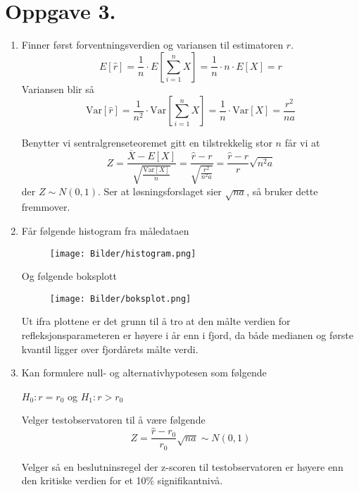\documentclass[a4paper,11pt,norsk]{article}
\begin{document}
\section*{Oppgave 3.}
\begin{enumerate}
    \item Finner først forventningsverdien og variansen til estimatoren $\hat{r}$.
        \[
            E[\hat{r}] = \frac{1}{n} \cdot E\left[\sum_{i=1}^{n}{X}\right] = \frac{1}{n} \cdot n \cdot E[X] = r
        \]
        Variansen blir så
        \[
            \text{Var}[\hat{r}] = \frac{1}{n^2} \cdot \text{Var}\left[\sum_{i=1}^{n}{X}\right] = \frac{1}{n} \cdot \text{Var}[X] = \frac{r^2}{na}
        \]

        Benytter vi sentralgrenseteoremet gitt en tilstrekkelig stor $n$ får vi at 
        \[
            Z = \frac{\overline{X} - E[X]}{\sqrt{\frac{\text{Var}[X]}{n}}} = \frac{\hat{r} - r}{\sqrt{\frac{r^2}{n^2a}}} = \frac{\hat{r} - r}{r} \sqrt{n^2a}
        \]
        der $Z \sim N(0, 1)$. Ser at løsningsforslaget sier $\sqrt{na}$, så bruker dette fremmover.
    \item 
        Får følgende histogram fra måledataen
        \begin{figure}[H]
            \centering 
            \texttt{[image: Bilder/histogram.png]}
        \end{figure}
        Og følgende boksplott
        \begin{figure}[H]
            \centering 
            \texttt{[image: Bilder/boksplot.png]}
        \end{figure}

        Ut ifra plottene er det grunn til å tro at den målte verdien for refleksjonsparameteren er høyere 
        i år enn i fjord, da både medianen og første kvantil ligger over fjordårets målte verdi.

    \item Kan formulere null- og alternativhypotesen som følgende
        \begin{center}
            $H_0: r = r_0$ \hspace{1cm} og \hspace{1cm} $H_1: r > r_0$
        \end{center}
    
        Velger testobservatoren til å være følgende
        \[
            Z = \frac{\hat{r} - r_0}{r_0} \sqrt{na} \sim N(0, 1)
        \]

        Velger så en beslutninsregel der z-scoren til testobservatoren er høyere enn den kritiske verdien
        for et 10\% signifikantnivå.


\end{enumerate}
\end{document}
